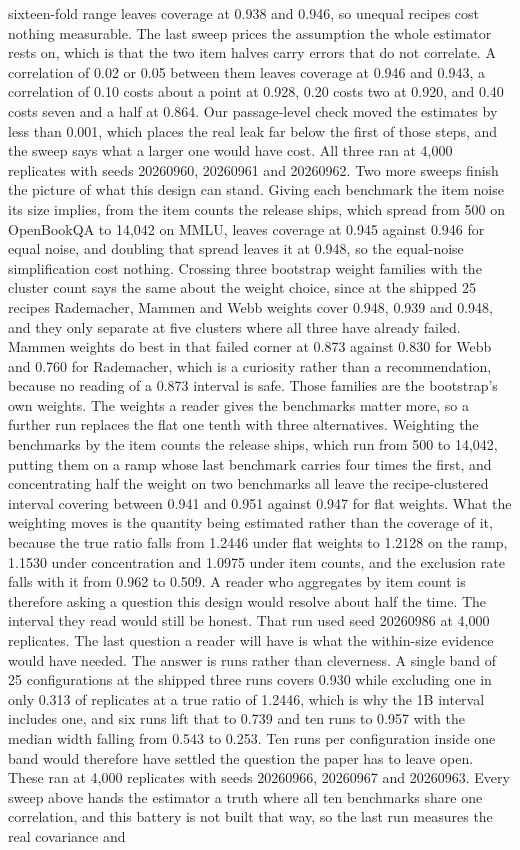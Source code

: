 sixteen-fold range leaves coverage at 0.938 and 0.946, so unequal recipes cost nothing measurable. The last sweep prices the assumption the whole estimator rests on, which is that the two item halves carry errors that do not correlate. A correlation of 0.02 or 0.05 between them leaves coverage at 0.946 and 0.943, a correlation of 0.10 costs about a point at 0.928, 0.20 costs two at 0.920, and 0.40 costs seven and a half at 0.864. Our passage-level check moved the estimates by less than 0.001, which places the real leak far below the first of those steps, and the sweep says what a larger one would have cost. All three ran at 4,000 replicates with seeds 20260960, 20260961 and 20260962. Two more sweeps finish the picture of what this design can stand. Giving each benchmark the item noise its size implies, from the item counts the release ships, which spread from 500 on OpenBookQA to 14,042 on MMLU, leaves coverage at 0.945 against 0.946 for equal noise, and doubling that spread leaves it at 0.948, so the equal-noise simplification cost nothing. Crossing three bootstrap weight families with the cluster count says the same about the weight choice, since at the shipped 25 recipes Rademacher, Mammen and Webb weights cover 0.948, 0.939 and 0.948, and they only separate at five clusters where all three have already failed. Mammen weights do best in that failed corner at 0.873 against 0.830 for Webb and 0.760 for Rademacher, which is a curiosity rather than a recommendation, because no reading of a 0.873 interval is safe. Those families are the bootstrap's own weights. The weights a reader gives the benchmarks matter more, so a further run replaces the flat one tenth with three alternatives. Weighting the benchmarks by the item counts the release ships, which run from 500 to 14,042, putting them on a ramp whose last benchmark carries four times the first, and concentrating half the weight on two benchmarks all leave the recipe-clustered interval covering between 0.941 and 0.951 against 0.947 for flat weights. What the weighting moves is the quantity being estimated rather than the coverage of it, because the true ratio falls from 1.2446 under flat weights to 1.2128 on the ramp, 1.1530 under concentration and 1.0975 under item counts, and the exclusion rate falls with it from 0.962 to 0.509. A reader who aggregates by item count is therefore asking a question this design would resolve about half the time. The interval they read would still be honest. That run used seed 20260986 at 4,000 replicates. The last question a reader will have is what the within-size evidence would have needed. The answer is runs rather than cleverness. A single band of 25 configurations at the shipped three runs covers 0.930 while excluding one in only 0.313 of replicates at a true ratio of 1.2446, which is why the 1B interval includes one, and six runs lift that to 0.739 and ten runs to 0.957 with the median width falling from 0.543 to 0.253. Ten runs per configuration inside one band would therefore have settled the question the paper has to leave open. These ran at 4,000 replicates with seeds 20260966, 20260967 and 20260963. Every sweep above hands the estimator a truth where all ten benchmarks share one correlation, and this battery is not built that way, so the last run measures the real covariance and 